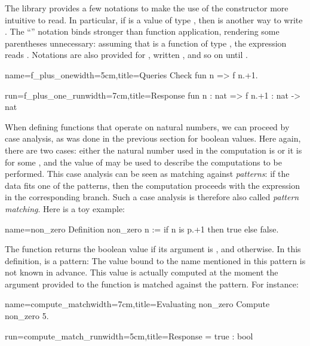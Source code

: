 The \mcbMC{} library provides a few notations to make the use of the
constructor  more intuitive to read.  In particular, if 
is a value of type , then  is another way to write
.  The ``'' notation binds stronger than function
application, rendering some parentheses unnecessary:
assuming  that  is a function of type
, the expression  reads
.  Notations are also provided for , written
, and so on until .

\begin{coq-left}{name=f_plus_one}{width=5cm,title=Queries}
Check fun n => f n.+1.
\end{coq-left}
\begin{coqout-right}{run=f_plus_one_run}{width=7cm,title=Response}
fun n : nat => f n.+1 : nat -> nat
\end{coqout-right}

When defining functions that operate on natural numbers, we
can
proceed by case analysis, as was done in the previous section for boolean
values. Here again, there are two cases: either the natural number used in
the computation is  or it is  for
some , and the value of  may be used to describe the
computations to be performed. This case analysis can be seen as
matching against \emph{patterns}: if the data fits one of
the patterns, then the computation proceeds with the expression in the
corresponding branch.  Such a case analysis is therefore also called
\emph{pattern matching}. Here is a toy example:

\begin{coq}{name=non_zero}{}
Definition non_zero n := if n is p.+1 then true else false.
\end{coq}
%

The function  returns the boolean value  if its
argument is , and  otherwise. In this definition,  is a
pattern: The value bound to the name  mentioned in this pattern is not
known in advance. This value is actually computed at the moment the
argument  provided to the function is matched against the
pattern. For instance:

\begin{coq-left}{name=compute_match}{width=7cm,title=Evaluating non_zero}
Compute non_zero 5.
\end{coq-left}
\begin{coqout-right}{run=compute_match_run}{width=5cm,title=Response}
= true : bool
\end{coqout-right}

